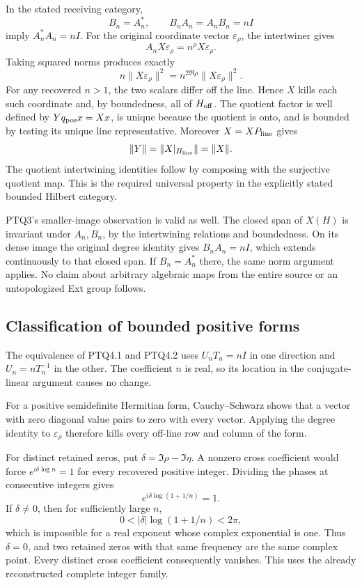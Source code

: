 In the stated receiving category, \[
B_n=A_n^*,\qquad B_nA_n=A_nB_n=nI
\] imply \(A_n^*A_n=nI\). For the original coordinate vector
\(\varepsilon_\rho\), the intertwiner gives \[
A_nX\varepsilon_\rho=n^\rho X\varepsilon_\rho.
\] Taking squared norms produces exactly \[
n\|X\varepsilon_\rho\|^2
=n^{2\Re\rho}\|X\varepsilon_\rho\|^2.
\] For any recovered \(n>1\), the two scalars differ off the line. Hence
\(X\) kills each such coordinate and, by boundedness, all of
\(H_{\rm off}\). The quotient factor is well defined by
\(Yq_{\rm pos}x=Xx\), is unique because the quotient is onto, and is
bounded by testing its unique line representative. Moreover
\(X=XP_{\rm line}\) gives \[
\|Y\|=\|X|_{H_{\rm line}}\|=\|X\|.
\] The quotient intertwining identities follow by composing with the
surjective quotient map. This is the required universal property in the
explicitly stated bounded Hilbert category.

PTQ3's smaller-image observation is valid as well. The closed span of
\(X(H)\) is invariant under \(A_n,B_n\), by the intertwining relations
and boundedness. On its dense image the original degree identity gives
\(B_nA_n=nI\), which extends continuously to that closed span. If
\(B_n=A_n^*\) there, the same norm argument applies. No claim about
arbitrary algebraic maps from the entire source or an untopologized Ext
group follows.

\subsection{Classification of bounded positive
forms}\label{classification-of-bounded-positive-forms}

The equivalence of PTQ4.1 and PTQ4.2 uses \(U_nT_n=nI\) in one direction
and \(U_n=nT_n^{-1}\) in the other. The coefficient \(n\) is real, so
its location in the conjugate-linear argument causes no change.

For a positive semidefinite Hermitian form, Cauchy--Schwarz shows that a
vector with zero diagonal value pairs to zero with every vector.
Applying the degree identity to \(\varepsilon_\rho\) therefore kills
every off-line row and column of the form.

For distinct retained zeros, put \(\delta=\Im\rho-\Im\eta\). A nonzero
cross coefficient would force \(e^{i\delta\log n}=1\) for every
recovered positive integer. Dividing the phases at consecutive integers
gives \[
e^{i\delta\log(1+1/n)}=1.
\] If \(\delta\ne0\), then for sufficiently large \(n\), \[
0<|\delta|\log(1+1/n)<2\pi,
\] which is impossible for a real exponent whose complex exponential is
one. Thus \(\delta=0\), and two retained zeros with that same frequency
are the same complex point. Every distinct cross coefficient
consequently vanishes. This uses the already reconstructed complete
integer family.

